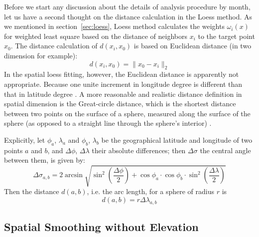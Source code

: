 Before we start any discussion about the details of analysis procedure by month,
let us have a second thought on the distance calculation in the Loess method.
As we mentioned in section~\ref{sec:loess}, Loess method calculates the weights 
$\omega_i(x)$
for weighted least square based on the distance of neighbors $x_i$ to the target 
point $x_0$. The distance calculation of $d(x_i, x_0)$ is based on Euclidean distance 
(in two dimension for example):
\begin{equation} 
d(x_i, x_0) = \| x_0 - x_i \|_2
\end{equation} 
In the spatial loess fitting, however, the Euclidean distance is apparently not 
appropriate. Because one unite increment in longitude degree is different than 
that in latitude degree \cite{banerjee2005geodetic}. A more reasonable and 
realistic distance definition in spatial dimension is the Great-circle distance, 
which is the shortest distance between two points on the surface of a sphere, 
measured along the surface of the sphere (as opposed to a straight line through 
the sphere's interior) \cite{greatcircle}. 

Explicitly, let $\phi_a$, $\lambda_a$ and $\phi_b$, $\lambda_b$ be the geographical 
latitude and longitude of two points $a$ and $b$, and $\Delta \phi$, 
$\Delta \lambda$ their absolute differences; then $\Delta \sigma$ the central angle 
between them, is given by:
\begin{equation} 
\Delta \sigma_{a,b} = 2 \arcsin \sqrt{ \sin^2 ( \frac{\Delta \phi}{2} ) + \cos 
\phi_a \cdot \cos \phi_b \cdot \sin^2 ( \frac{\Delta \lambda}{2} )}
\end{equation} 
Then the distance $d(a,b)$, i.e. the arc length, for a sphere of radius $r$ is
\begin{equation} 
d(a,b) = r \Delta \lambda_{a,b}
\end{equation} 

\subsection{Spatial Smoothing without Elevation}
\label{sec:impute.w/o.elev}

